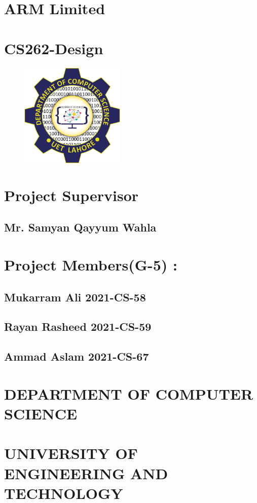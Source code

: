 \documentclass[12pt]{article}
\begin{document}
 \begin{center}
	    \section*{ARM Limited} 
	    \section*{CS262-Design} \hfill
	    \begin{figure}[!ht]
	            \begin{center}
	                \includegraphics[width=50mm]{logo.png}
	            \end{center}
        \end{figure}  
        \section*{Project Supervisor}
            \subsection*{Mr. Samyan Qayyum Wahla}
	    \section*{Project Members(G-5) :}
	        \subsection*{Mukarram Ali       2021-CS-58}
	        \subsection*{Rayan Rasheed      2021-CS-59}
	        \subsection*{Ammad Aslam        2021-CS-67} \hfill
	     \hfill \break
	    \section*{DEPARTMENT OF COMPUTER SCIENCE}
	    \section*{UNIVERSITY OF ENGINEERING AND TECHNOLOGY}
	    \newpage
	\end{center}
\end{document}
